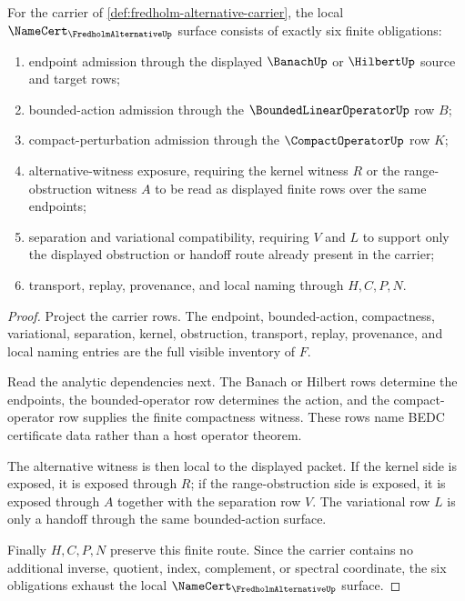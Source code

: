 \begin{theorem}
\label{thm:fredholm-alternative-namecert-obligations}
For the carrier of \autoref{def:fredholm-alternative-carrier}, the local $\NameCert_{\FredholmAlternativeUp}$ surface consists of exactly six finite obligations:
\begin{enumerate}
\item endpoint admission through the displayed $\BanachUp$ or $\HilbertUp$ source and target rows;
\item bounded-action admission through the $\BoundedLinearOperatorUp$ row $B$;
\item compact-perturbation admission through the $\CompactOperatorUp$ row $K$;
\item alternative-witness exposure, requiring the kernel witness $R$ or the range-obstruction witness $A$ to be read as displayed finite rows over the same endpoints;
\item separation and variational compatibility, requiring $V$ and $L$ to support only the displayed obstruction or handoff route already present in the carrier;
\item transport, replay, provenance, and local naming through $H,C,P,N$.
\end{enumerate}
\end{theorem}
\begin{proof}
Project the carrier rows. The endpoint, bounded-action, compactness, variational, separation, kernel, obstruction, transport, replay, provenance, and local naming entries are the full visible inventory of $F$.

Read the analytic dependencies next. The Banach or Hilbert rows determine the endpoints, the bounded-operator row determines the action, and the compact-operator row supplies the finite compactness witness. These rows name BEDC certificate data rather than a host operator theorem.

The alternative witness is then local to the displayed packet. If the kernel side is exposed, it is exposed through $R$; if the range-obstruction side is exposed, it is exposed through $A$ together with the separation row $V$. The variational row $L$ is only a handoff through the same bounded-action surface.

Finally $H,C,P,N$ preserve this finite route. Since the carrier contains no additional inverse, quotient, index, complement, or spectral coordinate, the six obligations exhaust the local $\NameCert_{\FredholmAlternativeUp}$ surface.
\end{proof}

